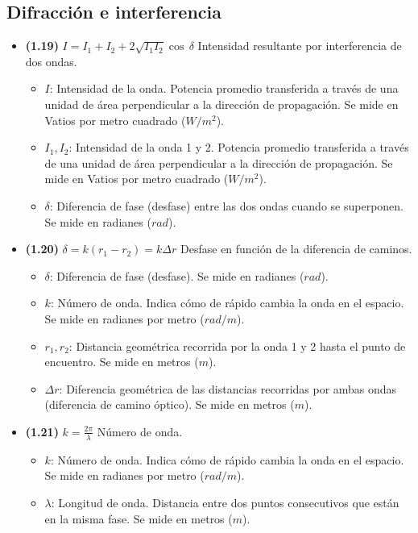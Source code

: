 \documentclass{article}
\begin{document}
		\subsection*{Difracción e interferencia}
			\begin{itemize}
				\item \textbf{(1.19)} $\boxed{I=I_{1}+I_{2}+2\sqrt{I_{1}I_{2}}\cos\,\delta}$ Intensidad resultante por interferencia de dos ondas.
					\begin{itemize}
						\item $I$: Intensidad de la onda. Potencia promedio transferida a través de una unidad de área perpendicular a la dirección de propagación. Se mide en Vatios por metro cuadrado ($W/m^2$).
						\item $I_1, I_2$: Intensidad de la onda 1 y 2. Potencia promedio transferida a través de una unidad de área perpendicular a la dirección de propagación. Se mide en Vatios por metro cuadrado ($W/m^2$).
						\item $\delta$: Diferencia de fase (desfase) entre las dos ondas cuando se superponen. Se mide en radianes ($rad$).
					\end{itemize}

				\item \textbf{(1.20)} $\boxed{\delta=k(r_{1}-r_{2})=k\Delta r}$ Desfase en función de la diferencia de caminos.
					\begin{itemize}
						\item $\delta$: Diferencia de fase (desfase). Se mide en radianes ($rad$).
						\item $k$: Número de onda. Indica cómo de rápido cambia la onda en el espacio. Se mide en radianes por metro ($rad/m$).
						\item $r_1, r_2$: Distancia geométrica recorrida por la onda 1 y 2 hasta el punto de encuentro. Se mide en metros ($m$).
						\item $\Delta r$: Diferencia geométrica de las distancias recorridas por ambas ondas (diferencia de camino óptico). Se mide en metros ($m$).
					\end{itemize}

				\item \textbf{(1.21)} $\boxed{k=\frac{2\pi}{\lambda}}$ Número de onda.
					\begin{itemize}
						\item $k$: Número de onda. Indica cómo de rápido cambia la onda en el espacio. Se mide en radianes por metro ($rad/m$).
						\item $\lambda$: Longitud de onda. Distancia entre dos puntos consecutivos que están en la misma fase. Se mide en metros ($m$).
					\end{itemize}


\end{itemize}
\end{document}
